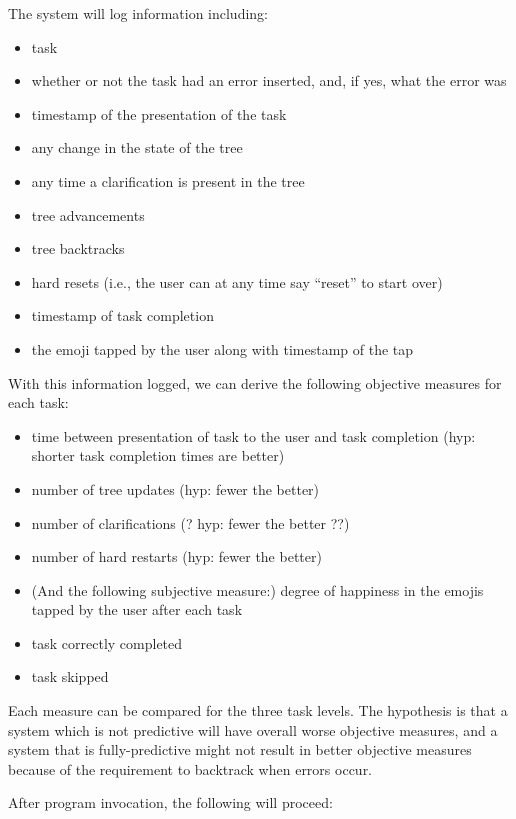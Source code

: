 \documentclass[a4paper,10pt]{article}
\begin{document}
The system will log information including:
\begin{itemize}
 \item task
 \item whether or not the task had an error inserted, and, if yes, what the error was 
 \item timestamp of the presentation of the task
 \item any change in the state of the tree
 \item any time a clarification is present in the tree
 \item tree advancements
 \item tree backtracks
 \item hard resets (i.e., the user can at any time say ``reset'' to start over)
 \item timestamp of task completion
 \item the emoji tapped by the user along with timestamp of the tap
\end{itemize}

With this information logged, we can derive the following objective measures for each task:
\begin{itemize}
 \item time between presentation of task to the user and task completion (hyp: shorter task completion times are better)
 \item number of tree updates (hyp: fewer the better)
 \item number of clarifications (? hyp: fewer the better ??)
 \item number of hard restarts (hyp: fewer the better)
 \item (And the following subjective measure:) degree of happiness in the emojis tapped by the user after each task
 \item task correctly completed
 \item task skipped
\end{itemize}

Each measure can be compared for the three task levels. The hypothesis is that a system which is not predictive will have overall worse objective measures, and a system that is fully-predictive might not result in better objective measures because of the requirement to backtrack when errors occur. 


After program invocation, the following will proceed:
\end{document}
